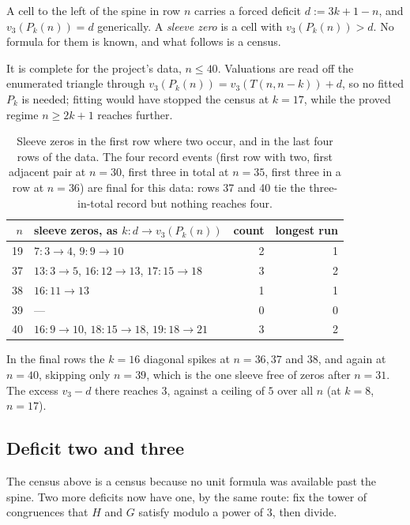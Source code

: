 \documentclass[11pt]{article}
\newcommand{\vthree}{v_3}
\begin{document}
A cell to the left of the spine in row $n$ carries a forced deficit
$d := 3k+1-n$, and $\vthree(P_k(n)) = d$ generically. A \emph{sleeve zero} is a
cell with $\vthree(P_k(n)) > d$. No formula for them is known, and what follows
is a census.

It is complete for the project's data, $n \le 40$. Valuations are read off the
enumerated triangle through $\vthree(P_k(n)) = \vthree(T(n,n-k)) + d$, so no
fitted $P_k$ is needed; fitting would have stopped the census at $k = 17$, while
the proved regime $n \ge 2k+1$ reaches further.

\begin{table}[H]
\centering\small
\begin{tabular}{r l r r}
\toprule
$n$ & sleeve zeros, as $k\!: d \to \vthree(P_k(n))$ & count & longest run \\
\midrule
19 & $7\!: 3\to4$, \; $9\!: 9\to10$ & 2 & 1 \\
37 & $13\!: 3\to5$, \; $16\!: 12\to13$, \; $17\!: 15\to18$ & 3 & 2 \\
38 & $16\!: 11\to13$ & 1 & 1 \\
39 & --- & 0 & 0 \\
40 & $16\!: 9\to10$, \; $18\!: 15\to18$, \; $19\!: 18\to21$ & 3 & 2 \\
\bottomrule
\end{tabular}
\caption{Sleeve zeros in the first row where two occur, and in the last four
rows of the data. The four record events (first row with two, first adjacent
pair at $n=30$, first three in total at $n=35$, first three in a row at $n=36$)
are final for this data: rows 37 and 40 tie the three-in-total record but nothing
reaches four.}
\label{tab:sleeve}
\end{table}

In the final rows the $k = 16$ diagonal spikes at $n = 36, 37$ and $38$, and
again at $n = 40$, skipping only $n = 39$, which is the one sleeve free of zeros
after $n = 31$. The excess $\vthree - d$ there reaches $3$, against a ceiling of
$5$ over all $n$ (at $k=8$, $n=17$).

\subsection{Deficit two and three}
\label{sec:deficit23}

The census above is a census because no unit formula was available past the
spine. Two more deficits now have one, by the same route: fix the tower of
congruences that $H$ and $G$ satisfy modulo a power of $3$, then divide.
\end{document}
